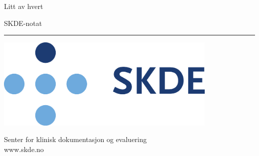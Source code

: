 \begin{titlepage}


\vspace*{1cm}

\noindent
{\textcolor{skde}{\titlefont \printtitle{}}}\par

\vspace*{0.5cm}
{\subtitlefont Litt av hvert}

\vspace*{1cm}
\epigraph{\sammendrag}{SKDE-notat \notatnummer}
\null\vfill
\vspace*{1cm}
\noindent
\hfill
\begin{minipage}{0.39\linewidth}
    \begin{flushright}
        \printauthor
    \end{flushright}
\end{minipage}
%
\begin{minipage}{0.02\linewidth}
\null
\end{minipage}
\begin{minipage}{0.02\linewidth}
    \rule{1pt}{\hoydestrek}
\end{minipage}
\titlepagedecoration


\hfill

\begin{minipage}{2in}
\includegraphics[width=0.8\textwidth]{figurer/skde}
\end{minipage}
\hfill
\begin{minipage}{3in}
\begin{flushright}
\textcolor{skde}{
Senter for klinisk dokumentasjon og evaluering\\
www.skde.no
}
\end{flushright}
\end{minipage}


\end{titlepage}
